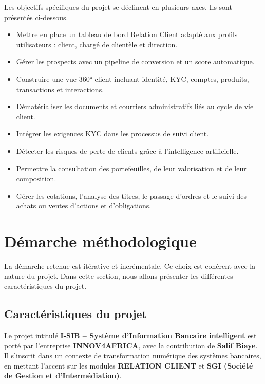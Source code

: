 \documentclass[a4paper,12pt]{report}
\begin{document}
Les objectifs spécifiques du projet se déclinent en plusieurs axes. Ils sont présentés ci-dessous.

\begin{itemize}
  \item Mettre en place un tableau de bord Relation Client adapté aux profils
        utilisateurs : client, chargé de clientèle et direction.
  \item Gérer les prospects avec un pipeline de conversion et un score
        automatique.
  \item Construire une vue 360° client incluant identité, KYC, comptes,
        produits, transactions et interactions.
  \item Dématérialiser les documents et courriers administratifs liés au cycle
        de vie client.
  \item Intégrer les exigences KYC dans les processus de suivi client.
  \item Détecter les risques de perte de clients grâce à l'intelligence
        artificielle.
  \item Permettre la consultation des portefeuilles, de leur valorisation et de
        leur composition.
  \item Gérer les cotations, l'analyse des titres, le passage d'ordres et le
        suivi des achats ou ventes d'actions et d'obligations.
\end{itemize}
\newpage

\section{Démarche méthodologique}

La démarche retenue est itérative et incrémentale. Ce choix est cohérent avec
la nature du projet. Dans cette section, nous allons présenter les différentes
caractéristiques du projet.


\subsection{Caractéristiques du projet}

Le projet intitulé \textbf{I-SIB – Système d'Information Bancaire intelligent} est porté par l'entreprise \textbf{INNOV4AFRICA}, avec la contribution de \textbf{Salif Biaye}. Il s'inscrit dans un contexte de transformation numérique des systèmes bancaires, en mettant l'accent sur les modules \textbf{RELATION CLIENT} et \textbf{SGI (Société de Gestion et d'Intermédiation)}.
\end{document}

